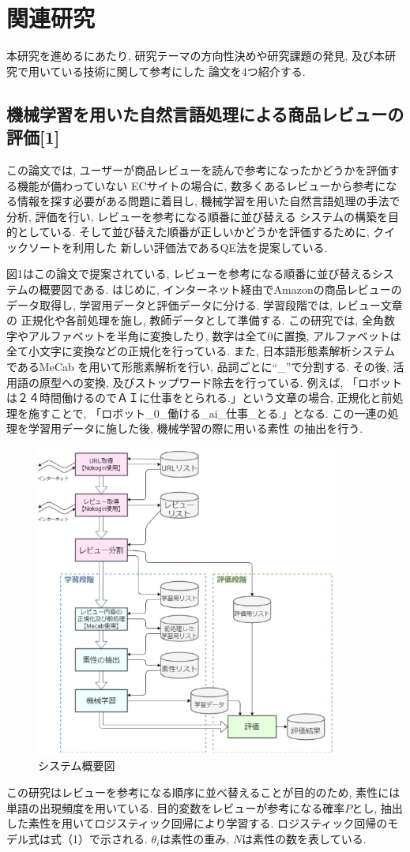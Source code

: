 \documentclass{ltjarticle}
\begin{document}
\newpage
\section{関連研究}
本研究を進めるにあたり, 研究テーマの方向性決めや研究課題の発見, 及び本研究で用いている技術に関して参考にした
論文を4つ紹介する. 
\subsection{機械学習を用いた自然言語処理による商品レビューの評価[1]}
この論文では, ユーザーが商品レビューを読んで参考になったかどうかを評価する機能が備わっていない
ECサイトの場合に, 数多くあるレビューから参考になる情報を探す必要がある問題に着目し, 
機械学習を用いた自然言語処理の手法で分析, 評価を行い, レビューを参考になる順番に並び替える
システムの構築を目的としている. そして並び替えた順番が正しいかどうかを評価するために, クイックソートを利用した
新しい評価法であるQE法を提案している. 

図1はこの論文で提案されている, レビューを参考になる順番に並び替えるシステムの概要図である. はじめに, 
インターネット経由でAmazonの商品レビューのデータ取得し, 学習用データと評価データに分ける. 学習段階では, レビュー文章の
正規化や各前処理を施し, 教師データとして準備する. 
この研究では, 全角数字やアルファベットを半角に変換したり, 
数字は全て0に置換, アルファベットは全て小文字に変換などの正規化を行っている. また, 日本語形態素解析システムであるMeCab
を用いて形態素解析を行い, 品詞ごとに``\_''で分割する. その後, 活用語の原型への変換, 及びストップワード除去を行っている.
例えば, 「ロボットは２４時間働けるのでＡＩに仕事をとられる.」という文章の場合, 正規化と前処理を施すことで, 
「ロボット\_0\_働ける\_ai\_仕事\_とる.」となる. この一連の処理を学習用データに施した後, 機械学習の際に用いる素性
の抽出を行う. 
\begin{figure}[h]
    \centering
    \includegraphics[width=10cm]{system1.png}
    \caption{システム概要図}
\end{figure}
この研究はレビューを参考になる順序に並べ替えることが目的のため, 素性には単語の出現頻度を用いている. 
目的変数をレビューが参考になる確率$P$とし, 抽出した素性を用いてロジスティック回帰により学習する. 
ロジスティック回帰のモデル式は式（1）で示される. $\theta_i$は素性の重み, $N$は素性の数を表している. 
\vspace{5truept}
\end{document}

